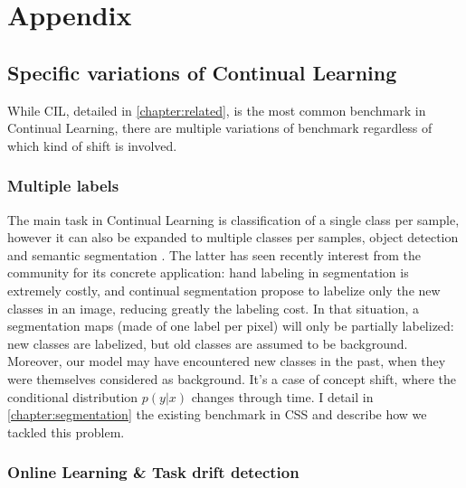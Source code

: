 \chapter{Appendix}
\label{chapter:appendix}

{}


\section{Specific variations of Continual Learning}
\label{sec:related_variation}

While \acf{CIL}, detailed in \autoref{chapter:related}, is the most common benchmark in Continual
Learning, there are multiple variations of benchmark regardless of which kind of shift is involved.

\subsection{Multiple labels}
\label{sec:related_multiple_labels}

The main task in Continual Learning is classification of a single class per sample, however it can
also be expanded to multiple classes per samples, \eg object detection
\citep{shmelkov2017incrementalobjectdetection} and semantic segmentation
\citep{michieli2019ilt,cermelli2020modelingthebackground}. The latter has seen recently interest
from the community for its concrete application: hand labeling in segmentation is extremely costly,
and continual segmentation propose to labelize only the new classes in an image, reducing greatly
the labeling cost. In that situation, a segmentation maps (made of one label per pixel) will only be
partially labelized: new classes are labelized, but old classes are assumed to be background.
Moreover, our model may have encountered new classes in the past, when they were themselves
considered as background. It's a case of concept shift, where the conditional distribution $p(y |
    x)$ changes through time. I detail in \autoref{chapter:segmentation} the existing benchmark in
\ac{CSS} and describe how we tackled this problem.

\subsection{Online Learning \& Task drift detection}
\label{sec:related_online_learning}

